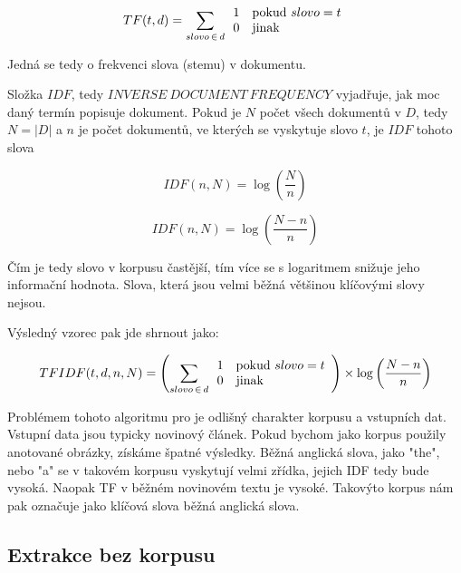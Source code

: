 \begin{equation}
 TF(t,d) = \sum_{slovo\,\in\,d} \begin{array}{l l} 1 & \mathrm{pokud}\ slovo = t \\
  0 & \mathrm{jinak} \end{array}
\end{equation}

Jedná se tedy o frekvenci slova (stemu) v dokumentu.

Složka $IDF$, tedy $INVERSE\ DOCUMENT\ FREQUENCY$ vyjadřuje, jak moc daný termín popisuje dokument. Pokud je $N$ počet všech dokumentů v $D$, tedy $N = |D|$ a $n$ je počet dokumentů, ve kterých se vyskytuje slovo $t$, je $IDF$ tohoto slova

\begin{equation}
IDF(n,N) = \log \left(\frac{N}{n}\right)
\end{equation}

\begin{equation}
IDF(n,N) = \log \left(\frac{N - n}{n}\right)
\end{equation}

Čím je tedy slovo v korpusu častější, tím více se s logaritmem snižuje jeho informační hodnota. Slova, která jsou velmi běžná většinou klíčovými slovy nejsou.

Výsledný vzorec pak jde shrnout jako:

\begin{equation}
TFIDF(t,d,n,N)= \left(\sum_{slovo\,\in\,d} \begin{array}{l l} 1 & \mathrm{pokud}\ slovo = t \\
  0 & \mathrm{jinak} \end{array}\right)
  \times
  \log \left(\frac{N - n}{n}\right)
\end{equation}

Problémem tohoto algoritmu pro je odlišný charakter korpusu a vstupních dat. Vstupní data jsou typicky novinový článek. Pokud bychom jako korpus použily anotované obrázky, získáme špatné výsledky. Běžná anglická slova, jako "the", nebo "a" se v takovém korpusu vyskytují velmi zřídka, jejich IDF tedy bude vysoká. Naopak TF v běžném novinovém textu je vysoké. Takovýto korpus nám pak označuje jako klíčová slova běžná anglická slova.


\subsection{Extrakce bez korpusu}

